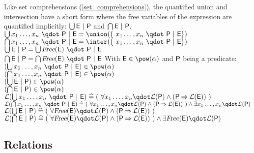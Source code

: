 \begin{samepage}
\begin{rodinrefentry}
    Like set comprehensions (\ref{set_comprehensions}), the quantified union and intersection have a
    short form where the free variables of the expression are quantified implicitly:
    $\bigcup\nolimits \textsf{E}~|~\textsf{P}$ and $\bigcap\nolimits \textsf{E}~|~\textsf{P}$.
  \rrdef
    $\Union x_1\ldots,x_n~\qdot~\predp~|~\expre = \union(\{~x_1\ldots,x_n~\qdot~\predp~|~\expre\})$\\
    $\Inter x_1\ldots,x_n~\qdot~\predp~|~\expre = \inter(\{~x_1\ldots,x_n~\qdot~\predp~|~\expre\})$\\
    $\Union \expre~|~\predp = \Union \freeids{\expre}~\qdot~\predp~|~\expre$\\
    $\Inter \expre~|~\predp = \Inter \freeids{\expre}~\qdot~\predp~|~\expre$
  \rrtypes
    With $\expre\in\pow(\alpha)$ and $\textsf{P}$ being a predicate:\\
    $(\Union x_1\ldots,x_n~\qdot~\predp~|~\expre) \in \pow(\alpha)$\\
    $(\Inter x_1\ldots,x_n~\qdot~\predp~|~\expre) \in \pow(\alpha)$\\
    $(\Union \expre~|~\predp) \in \pow(\alpha)$\\
    $(\Inter \expre~|~\predp) \in \pow(\alpha)$\\
  \rrwd
    $\wdl(\Union x_1\ldots,x_n~\qdot~\predp~|~\expre) \defi (~\forall x_1\ldots,x_n \qdot \wdl(\predp) \land (\predp\limp\wdl(\expre))~)$\\
    $\wdl(\Inter x_1\ldots,x_n~\qdot~\predp~|~\expre) \defi (~\forall x_1\ldots,x_n \qdot \wdl(\predp) \land (\predp\limp\wdl(\expre))~) \land \exists x_1\ldots,x_n \qdot \wdl(\predp)$\\
    $\wdl(\Union \expre~|~\predp) \defi (~\forall\freeids{\expre} \qdot \wdl(\predp) \land (\predp\limp\wdl(\expre))~)$\\
    $\wdl(\Inter \expre~|~\predp) \defi (~\forall\freeids{\expre} \qdot \wdl(\predp) \land (\predp\limp\wdl(\expre))~) \land \exists\freeids{\expre} \qdot \wdl(\predp)$
\end{rodinrefentry}
\end{samepage}

\subsection{Relations}
\label{relations}

